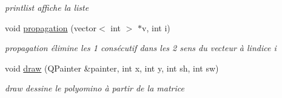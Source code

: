 \begin{DoxyCompactItemize}
\begin{DoxyCompactList}\small\item\em printlist affiche la liste \end{DoxyCompactList}\item 
void \hyperlink{classmatrix_ab7e0ecebed1613e34a3cd81a3c5ad8b4}{propagation} (vector$<$ int $>$ $\ast$v, int i)
\begin{DoxyCompactList}\small\item\em propagation élimine les 1 consécutif dans les 2 sens du vecteur à l\textquotesingle{}indice i \end{DoxyCompactList}\item 
void \hyperlink{classmatrix_aba69eb1058b43b8690014fcbdf1764a6}{draw} (Q\+Painter \&painter, int x, int y, int sh, int sw)
\begin{DoxyCompactList}\small\item\em draw dessine le polyomino à partir de la matrice \end{DoxyCompactList}\end{DoxyCompactItemize}
